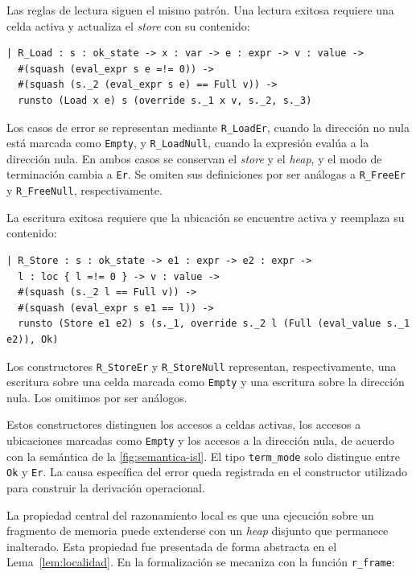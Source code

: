 \documentclass[a4paper,	11pt]{report}
\begin{document}
Las reglas de lectura siguen el mismo patrón.
Una lectura exitosa requiere una celda activa y actualiza el \emph{store} con su contenido:

\begin{lstlisting}
| R_Load : s : ok_state -> x : var -> e : expr -> v : value ->
  #(squash (eval_expr s e =!= 0)) ->
  #(squash (s._2 (eval_expr s e) == Full v)) ->
  runsto (Load x e) s (override s._1 x v, s._2, s._3)
\end{lstlisting}

Los casos de error se representan mediante \lstinline|R_LoadEr|,
cuando la dirección no nula está marcada como \lstinline|Empty|,
y \lstinline|R_LoadNull|,
cuando la expresión evalúa a la dirección nula.
En ambos casos se conservan el \emph{store} y el \emph{heap},
y el modo de terminación cambia a \lstinline|Er|.
Se omiten sus definiciones por ser análogas a \lstinline|R_FreeEr| y \lstinline|R_FreeNull|,
respectivamente.

La escritura exitosa requiere que la ubicación se encuentre activa y reemplaza su contenido:

\begin{lstlisting}
| R_Store : s : ok_state -> e1 : expr -> e2 : expr ->
  l : loc { l =!= 0 } -> v : value ->
  #(squash (s._2 l == Full v)) ->
  #(squash (eval_expr s e1 == l)) ->
  runsto (Store e1 e2) s (s._1, override s._2 l (Full (eval_value s._1 e2)), Ok)
\end{lstlisting}

Los constructores \lstinline|R_StoreEr| y \lstinline|R_StoreNull| representan,
respectivamente, una escritura sobre una celda marcada como \lstinline|Empty| y una escritura sobre la dirección nula.
Los omitimos por ser análogos.

Estos constructores distinguen los accesos a celdas activas,
los accesos a ubicaciones marcadas como \lstinline|Empty| y los accesos a la dirección nula,
de acuerdo con la semántica de la \autoref{fig:semantica-isl}.
El tipo \lstinline|term_mode| solo distingue entre \lstinline|Ok| y \lstinline|Er|.
La causa específica del error queda registrada en el constructor utilizado para construir la derivación operacional.

La propiedad central del razonamiento local es que una ejecución sobre un fragmento de memoria
puede extenderse con un \emph{heap} disjunto que permanece inalterado.
Esta propiedad fue presentada de forma abstracta en el Lema~\ref{lem:localidad}.
En la formalización se mecaniza con la función \lstinline|r_frame|:
\end{document}
